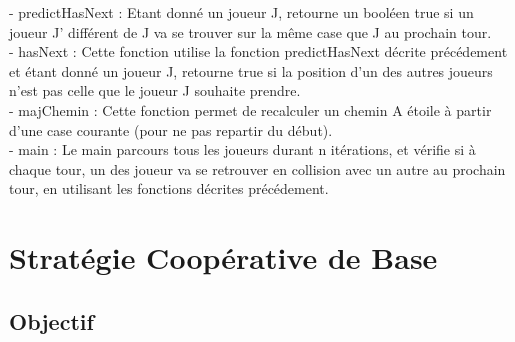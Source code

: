 \documentclass{article}
\begin{document}
-  predictHasNext : Etant donné un joueur J, retourne un booléen true si un joueur J' différent de J va se trouver sur la même case que J au prochain tour. \\
	
- hasNext : Cette fonction utilise la fonction predictHasNext décrite précédement et étant donné un joueur J, retourne true si la position d'un des autres joueurs n'est pas celle que le joueur J souhaite prendre. \\ 
	
- majChemin : Cette fonction permet de recalculer un chemin A étoile à partir d'une case courante (pour ne pas repartir du début). \\ 
	
- main : Le main parcours tous les joueurs durant n itérations, et vérifie si à chaque tour, un des joueur va se retrouver en collision avec un autre au prochain tour, en utilisant les fonctions décrites précédement. \\ 
	
	
	
\section{Stratégie Coopérative de Base}
	\subsection{Objectif}
	
\end{document}
